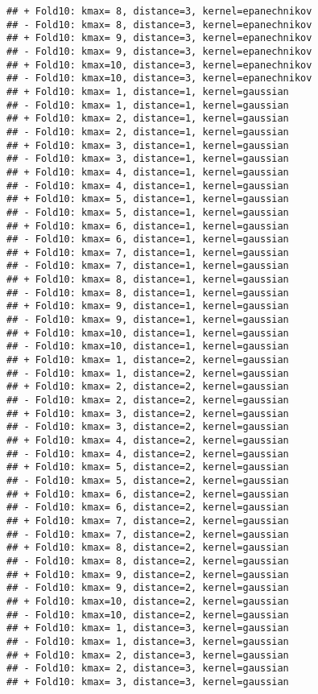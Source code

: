 \documentclass[
]{article}
\begin{document}
\begin{verbatim}
## + Fold10: kmax= 8, distance=3, kernel=epanechnikov 
## - Fold10: kmax= 8, distance=3, kernel=epanechnikov 
## + Fold10: kmax= 9, distance=3, kernel=epanechnikov 
## - Fold10: kmax= 9, distance=3, kernel=epanechnikov 
## + Fold10: kmax=10, distance=3, kernel=epanechnikov 
## - Fold10: kmax=10, distance=3, kernel=epanechnikov 
## + Fold10: kmax= 1, distance=1, kernel=gaussian 
## - Fold10: kmax= 1, distance=1, kernel=gaussian 
## + Fold10: kmax= 2, distance=1, kernel=gaussian 
## - Fold10: kmax= 2, distance=1, kernel=gaussian 
## + Fold10: kmax= 3, distance=1, kernel=gaussian 
## - Fold10: kmax= 3, distance=1, kernel=gaussian 
## + Fold10: kmax= 4, distance=1, kernel=gaussian 
## - Fold10: kmax= 4, distance=1, kernel=gaussian 
## + Fold10: kmax= 5, distance=1, kernel=gaussian 
## - Fold10: kmax= 5, distance=1, kernel=gaussian 
## + Fold10: kmax= 6, distance=1, kernel=gaussian 
## - Fold10: kmax= 6, distance=1, kernel=gaussian 
## + Fold10: kmax= 7, distance=1, kernel=gaussian 
## - Fold10: kmax= 7, distance=1, kernel=gaussian 
## + Fold10: kmax= 8, distance=1, kernel=gaussian 
## - Fold10: kmax= 8, distance=1, kernel=gaussian 
## + Fold10: kmax= 9, distance=1, kernel=gaussian 
## - Fold10: kmax= 9, distance=1, kernel=gaussian 
## + Fold10: kmax=10, distance=1, kernel=gaussian 
## - Fold10: kmax=10, distance=1, kernel=gaussian 
## + Fold10: kmax= 1, distance=2, kernel=gaussian 
## - Fold10: kmax= 1, distance=2, kernel=gaussian 
## + Fold10: kmax= 2, distance=2, kernel=gaussian 
## - Fold10: kmax= 2, distance=2, kernel=gaussian 
## + Fold10: kmax= 3, distance=2, kernel=gaussian 
## - Fold10: kmax= 3, distance=2, kernel=gaussian 
## + Fold10: kmax= 4, distance=2, kernel=gaussian 
## - Fold10: kmax= 4, distance=2, kernel=gaussian 
## + Fold10: kmax= 5, distance=2, kernel=gaussian 
## - Fold10: kmax= 5, distance=2, kernel=gaussian 
## + Fold10: kmax= 6, distance=2, kernel=gaussian 
## - Fold10: kmax= 6, distance=2, kernel=gaussian 
## + Fold10: kmax= 7, distance=2, kernel=gaussian 
## - Fold10: kmax= 7, distance=2, kernel=gaussian 
## + Fold10: kmax= 8, distance=2, kernel=gaussian 
## - Fold10: kmax= 8, distance=2, kernel=gaussian 
## + Fold10: kmax= 9, distance=2, kernel=gaussian 
## - Fold10: kmax= 9, distance=2, kernel=gaussian 
## + Fold10: kmax=10, distance=2, kernel=gaussian 
## - Fold10: kmax=10, distance=2, kernel=gaussian 
## + Fold10: kmax= 1, distance=3, kernel=gaussian 
## - Fold10: kmax= 1, distance=3, kernel=gaussian 
## + Fold10: kmax= 2, distance=3, kernel=gaussian 
## - Fold10: kmax= 2, distance=3, kernel=gaussian 
## + Fold10: kmax= 3, distance=3, kernel=gaussian 

\end{verbatim}
\end{document}
